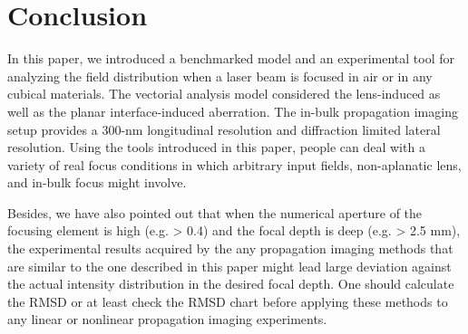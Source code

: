 \documentclass[9pt,twocolumn,twoside]{osajnl}
\begin{document}
\section{Conclusion}
In this paper, we introduced a benchmarked model and an experimental tool for analyzing the field distribution when a laser beam is focused in air or in any cubical materials. The vectorial analysis model considered the lens-induced as well as the planar interface-induced aberration. The in-bulk propagation imaging setup provides a 300-nm longitudinal resolution and diffraction limited lateral resolution. Using the tools introduced in this paper, people can deal with a variety of real focus conditions in which arbitrary input fields, non-aplanatic lens, and in-bulk focus might involve. 

Besides, we have also pointed out that when the numerical aperture of the focusing element is high (e.g. > 0.4) and the focal depth is deep (e.g. > 2.5 mm), the experimental results acquired by the any propagation imaging methods that are similar to the one described in this paper might lead large deviation against the actual intensity distribution in the desired focal depth. One should calculate the RMSD or at least check the RMSD chart before applying these methods to any linear or nonlinear propagation imaging experiments. 


\appendix
\end{document}
